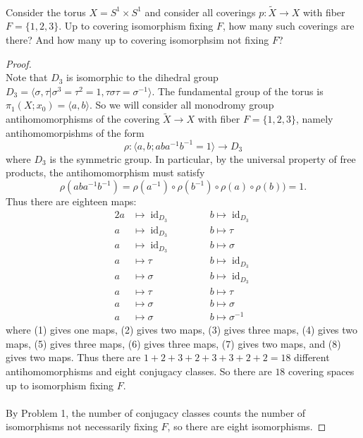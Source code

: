 \documentclass{article}
\newenvironment{problem}[2][Problem]{\begin{trivlist}
\item[\hskip \labelsep {\bfseries #1}\hskip \labelsep {\bfseries #2.}]}{\end{trivlist}}
\newcommand{\fn}[3]{#1 \colon #2 \rightarrow #3}
\newcommand{\inv}[1]{#1^{-1}}
\newcommand{\set}[1]{\{ #1 \}}
\begin{document}
\pagebreak
\begin{problem}{2} \text{} \\
  Consider the torus $X = S^1 \times S^1$ and consider all coverings
  $\fn{p}{\widetilde X}{X}$ with fiber $F = \set{1, 2, 3}$. Up to covering
  isomorphism fixing $F$, how many such coverings are there? And how many up to
  covering isomorphsim not fixing $F$?
\end{problem}

\begin{proof} \text{} \\
  Note that $D_3$ is isomorphic to the dihedral group
  $D_3 = \langle \sigma, \tau | \sigma^3 = \tau^2 = 1, \tau\sigma\tau = \inv\sigma \rangle$.
  The fundamental group of the torus is
  $\pi_1(X; x_0) = \langle a, b \rangle$. So we will consider all monodromy
  group antihomomorphisms of the covering $\widetilde X \rightarrow X$ with
  fiber $F = \set{1,2,3}$, namely antihomomorpishms of the form \[
    \fn{\rho}{\langle a, b; aba^{-1}b^{-1} = 1 \rangle}{D_3}
  \] where $D_3$ is the symmetric group.
  In particular, by the universal property of free products, the antihomomorphism
  must satisfy \[
  \rho(ab\inv a\inv b)
    = \rho(\inv a) \circ \rho(\inv b) \circ \rho(a) \circ \rho (b))
    = 1.
  \]
  Thus there are eighteen maps:
  \begin{alignat}{2}
    a &\mapsto \operatorname{id}_{D_3} &&\hspace{1cm} b \mapsto \operatorname{id}_{D_3} \\
    a &\mapsto \operatorname{id}_{D_3} &&\hspace{1cm} b \mapsto \tau \\
    a &\mapsto \operatorname{id}_{D_3} &&\hspace{1cm} b \mapsto \sigma \\
    a &\mapsto \tau &&\hspace{1cm} b \mapsto \operatorname{id}_{D_3} \\
    a &\mapsto \sigma &&\hspace{1cm} b \mapsto \operatorname{id}_{D_3} \\
    a &\mapsto \tau &&\hspace{1cm} b \mapsto \tau \\
    a &\mapsto \sigma &&\hspace{1cm} b \mapsto \sigma \\
    a &\mapsto \sigma &&\hspace{1cm} b \mapsto \inv\sigma
  \end{alignat}
  where
  (1) gives one maps,
  (2) gives two maps,
  (3) gives three maps,
  (4) gives two maps,
  (5) gives three maps,
  (6) gives three maps,
  (7) gives two maps, and
  (8) gives two maps.
  Thus there are $1 + 2 + 3 + 2 + 3 + 3 + 2 + 2 = 18$ different
  antihomomorphisms and eight conjugacy classes. So there are $18$ covering
  spaces up to isomorphism fixing $F$.
  \\~\\
  By Problem 1, the number of conjugacy classes counts the number of
  isomorphisms not necessarily fixing $F$, so there are eight isomorphisms.
\end{proof}
\end{document}
